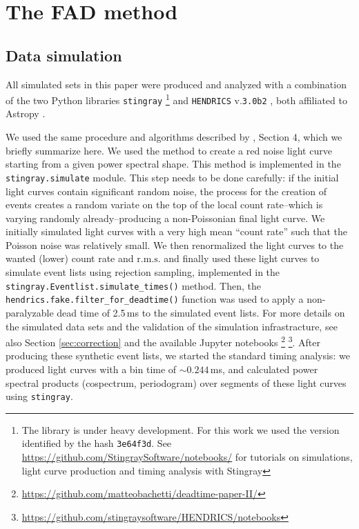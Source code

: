 \documentclass[twocolumn]{aastex61}
\newcommand{\rms}{\ensuremath{\mathrm{r.m.s.}}\xspace}
\begin{document}

\section{The FAD method} \label{sec:fadsec}
\subsection{Data simulation} \label{sec:data}
All simulated sets in this paper were produced and analyzed with a combination of the two Python libraries \texttt{stingray}%
\footnote{The library is under heavy development.
    For this work we used the version identified by the hash \texttt{3e64f3d}.
    See \href{https://github.com/StingraySoftware/notebooks/}{https://github.com/StingraySoftware/notebooks/} for tutorials on simulations, light curve production and timing analysis with Stingray}
\citep{huppenkothen2016} and \texttt{HENDRICS} v.\texttt{3.0b2} \citep[formerly known as MaLTPyNT;][]{2015ascl.soft02021B}, both affiliated to Astropy \citep{astropy2013,astropy18}.

We used the same procedure and algorithms described by \citet{Bachetti+15}, Section 4, which we briefly summarize here.
We used the \citet{timmer1995} method to create a red noise light curve starting from a given power spectral shape. 
This method is implemented in the \texttt{stingray.simulate} module.
This step needs to be done carefully: if the initial light curves contain significant random noise, the process for the creation of events creates a random variate on the top of the local count rate--which is varying randomly already--producing a non-Poissonian final light curve. 
We initially simulated light curves with a very high mean ``count rate'' such that the Poisson noise was relatively small. We then renormalized the light curves to the wanted (lower) count rate and \rms and finally used these light curves to simulate event lists using rejection sampling, implemented in the \texttt{stingray.Eventlist.simulate\_times()} method.
Then, the \texttt{hendrics.fake.filter\_for\_deadtime()} function was used to apply a non-paralyzable dead time of 2.5\,ms to the simulated event lists. For more details on the simulated data sets and the validation of the simulation infrastracture, see also Section \ref{sec:correction} and the available Jupyter notebooks%
\footnote{\href{https://github.com/matteobachetti/deadtime-paper-II/}{https://github.com/matteobachetti/deadtime-paper-II/}}%
\footnote{\href{https://github.com/stingraysoftware/HENDRICS/notebooks}{https://github.com/stingraysoftware/HENDRICS/notebooks}}.
After producing these synthetic event lists, we started the standard timing analysis: we produced light curves with a bin time of $\sim0.244$\,ms, and calculated power spectral products (cospectrum, periodogram) over segments of these light curves using \texttt{stingray}.
\end{document}
